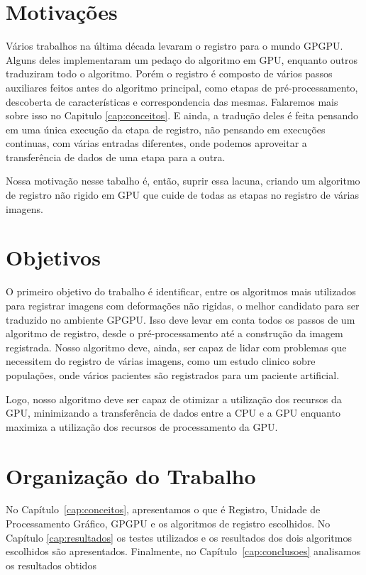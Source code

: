 \section{Motivações}
	Vários trabalhos na última década levaram o registro para o mundo GPGPU. Alguns deles implementaram um pedaço do 
algoritmo em GPU, enquanto outros traduziram todo o algoritmo. Porém o registro é composto de vários passos auxiliares
feitos antes do algoritmo principal, como etapas de pré-processamento, descoberta de características e correspondencia
das mesmas. Falaremos mais sobre isso no Capitulo \ref{cap:conceitos}. E ainda, a tradução deles é feita pensando em 
uma única execução da etapa de registro, não pensando em execuções continuas, com várias entradas diferentes, onde 
podemos aproveitar a transferência de dados de uma etapa para a outra.
	
	Nossa motivação nesse tabalho é, então, suprir essa lacuna, criando um algoritmo de registro não rigido em GPU que
cuide de todas as etapas no registro de várias imagens.
\section{Objetivos}
	O primeiro objetivo do trabalho é identificar, entre os algoritmos mais utilizados para registrar imagens com 
deformações não rigidas, o melhor candidato para ser traduzido no ambiente GPGPU. Isso deve levar em conta todos os 
passos de um algoritmo de registro, desde o pré-processamento até a construção da imagem registrada. Nosso algoritmo deve,
ainda, ser capaz de lidar com problemas que necessitem do registro de várias imagens, como um estudo clinico sobre 
populações, onde vários pacientes são registrados para um paciente artificial.

	Logo, nosso algoritmo deve ser capaz de otimizar a utilização dos recursos da GPU, minimizando a transferência de dados
entre a CPU e a GPU enquanto maximiza a utilização dos recursos de processamento da GPU.
\section{Organização do Trabalho}
\label{sec:organizacao_trabalho}

No Capítulo~\ref{cap:conceitos}, apresentamos o que é Registro, Unidade de Processamento Gráfico, GPGPU e os algoritmos 
de registro escolhidos. No Capítulo \ref{cap:resultados} os testes utilizados e os resultados dos dois algoritmos 
escolhidos são apresentados. Finalmente, no Capítulo~\ref{cap:conclusoes} analisamos os resultados obtidos 